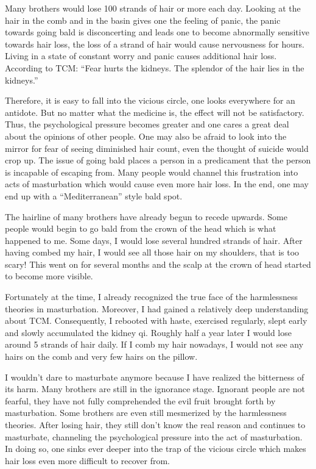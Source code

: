 \documentclass[
]{book}
\begin{document}
Many brothers would lose 100 strands of hair or more each day. Looking at the hair in the comb and in the basin gives one the feeling of panic, the panic towards going bald is disconcerting and leads one to become abnormally sensitive towards hair loss, the loss of a strand of hair would cause nervousness for hours. Living in a state of constant worry and panic causes additional hair loss. According to TCM: ``Fear hurts the kidneys. The splendor of the hair lies in the kidneys.''

Therefore, it is easy to fall into the vicious circle, one looks everywhere for an antidote. But no matter what the medicine is, the effect will not be satisfactory. Thus, the psychological pressure becomes greater and one cares a great deal about the opinions of other people. One may also be afraid to look into the mirror for fear of seeing diminished hair count, even the thought of suicide would crop up. The issue of going bald places a person in a predicament that the person is incapable of escaping from. Many people would channel this frustration into acts of masturbation which would cause even more hair loss. In the end, one may end up with a ``Mediterranean'' style bald spot.

The hairline of many brothers have already begun to recede upwards. Some people would begin to go bald from the crown of the head which is what happened to me. Some days, I would lose several hundred strands of hair. After having combed my hair, I would see all those hair on my shoulders, that is too scary! This went on for several months and the scalp at the crown of head started to become more visible.

Fortunately at the time, I already recognized the true face of the harmlessness theories in masturbation. Moreover, I had gained a relatively deep understanding about TCM. Consequently, I rebooted with haste, exercised regularly, slept early and slowly accumulated the kidney qi. Roughly half a year later I would lose around 5 strands of hair daily. If I comb my hair nowadays, I would not see any hairs on the comb and very few hairs on the pillow.

I wouldn't dare to masturbate anymore because I have realized the bitterness of its harm. Many brothers are still in the ignorance stage. Ignorant people are not fearful, they have not fully comprehended the evil fruit brought forth by masturbation. Some brothers are even still mesmerized by the harmlessness theories. After losing hair, they still don't know the real reason and continues to masturbate, channeling the psychological pressure into the act of masturbation. In doing so, one sinks ever deeper into the trap of the vicious circle which makes hair loss even more difficult to recover from.
\end{document}
